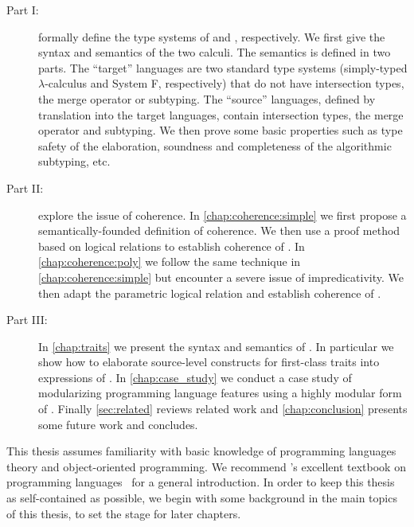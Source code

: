 \begin{description}
\item[Part I:]  formally define the type systems of
  \namee and \fnamee, respectively. We first give the syntax and semantics of
  the two calculi. The semantics is defined in two parts. The ``target''
  languages are two standard type systems (simply-typed $\lambda$-calculus and
  System F, respectively) that do not have intersection types, the merge
  operator or subtyping. The ``source'' languages, defined by translation into
  the target languages, contain intersection types, the merge operator and
  subtyping. We then prove some basic properties such as type safety of
  the elaboration, soundness and completeness of the algorithmic subtyping, etc.
\item[Part II:]  explore the
  issue of coherence. In \cref{chap:coherence:simple} we first propose a
  semantically-founded definition of coherence. We then use a proof method based
  on logical relations to establish coherence of \namee. In
  \cref{chap:coherence:poly} we follow the same technique in
  \cref{chap:coherence:simple} but encounter a severe issue of impredicativity. We
  then adapt the parametric logical relation and establish coherence of \fnamee.
\item[Part III:] In \cref{chap:traits} we present the syntax and semantics of
  \sedel. In particular we show how to elaborate source-level constructs for
  first-class traits into expressions of \fnamee. In \cref{chap:case_study} we
  conduct a case study of modularizing programming language features using a
  highly modular form of \visitor. Finally \cref{sec:related} reviews related
  work and \cref{chap:conclusion} presents some future work and concludes.
\end{description}

This thesis assumes familiarity with basic knowledge of programming languages
theory and object-oriented programming. We recommend
\citeauthor{DBLP:books/daglib/0005958}'s excellent textbook on programming
languages~\citep{DBLP:books/daglib/0005958} for a general introduction. In order
to keep this thesis as self-contained as possible, we begin with some
background in the main topics of this thesis, to set the stage for later
chapters.


